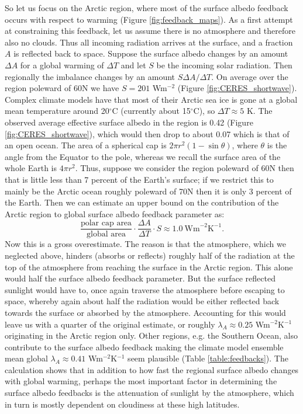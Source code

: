 \documentclass[12pt]{book}
\begin{document}
So let us focus on the Arctic region, where most of the surface albedo feedback occurs with respect to warming (Figure \ref{fig:feedback_maps}). As a first attempt at constraining this feedback, let us assume there is no atmosphere and therefore also no clouds. Thus all incoming radiation arrives at the surface, and a fraction $A$ is reflected back to space. Suppose the surface albedo changes by an amount $\Delta A$ for a global warming of $\Delta T$ and let $S$ be the incoming solar radiation. Then regionally the imbalance changes by an amount $S \Delta A / \Delta T$. On average over the region poleward of 60N we have $S=201$ Wm$^{-2}$ (Figure \ref{fig:CERES_shortwave}). Complex climate models have that most of their Arctic sea ice is gone at a global mean temperature around 20$^\circ$C (currently about 15$^\circ$C), so $\Delta T \approx 5$ K. The observed average effective surface albedo in the region is 0.42 (Figure \ref{fig:CERES_shortwave}), which would then drop to about 0.07 which is that of an open ocean. The area of a spherical cap is $2\pi r^2 (1-\sin\theta)$, where $\theta$ is the angle from the Equator to the pole, whereas we recall the surface area of the whole Earth is $4\pi r^2$. Thus, suppose we consider the region poleward of 60N then that is little less than 7 percent of the Earth's surface; if we restrict this to mainly be the Arctic ocean roughly poleward of 70N then it is only 3 percent of the Earth. Then we can estimate an upper bound on the contribution of the Arctic region to global surface albedo feedback parameter as:
\begin{equation}
\frac{\textrm{polar cap area}}{\textrm{global area}} \cdot \frac{\Delta A} {\Delta T} \cdot S \approx 1.0 \ \textrm{Wm}^{-2}\textrm{K}^{-1}.
\end{equation}
Now this is a gross overestimate. The reason is that the atmosphere, which we neglected above, hinders (absorbs or reflects) roughly half of the radiation at the top of the atmosphere from reaching the surface in the Arctic region. This alone would half the surface albedo feedback parameter. But the surface reflected sunlight would have to, once again traverse the atmosphere before escaping to space, whereby again about half the radiation would be either reflected back towards the surface or absorbed by the atmosphere. Accounting for this would leave us with a quarter of the original estimate, or roughly $\lambda_A \approx 0.25$ Wm$^{-2}$K$^{-1}$ originating in the Arctic region only. Other regions, e.g. the Southern Ocean, also contribute to the surface albedo feedback making the climate model ensemble mean global $\lambda_A \approx 0.41$ Wm$^{-2}$K$^{-1}$ seem plausible (Table \ref{table:feedbacks}). The calculation shows that in addition to how fast the regional surface albedo changes with global warming, perhaps the most important factor in determining the surface albedo feedbacks is the attenuation of sunlight by the atmosphere, which in turn is mostly dependent on cloudiness at these high latitudes.
\end{document}
